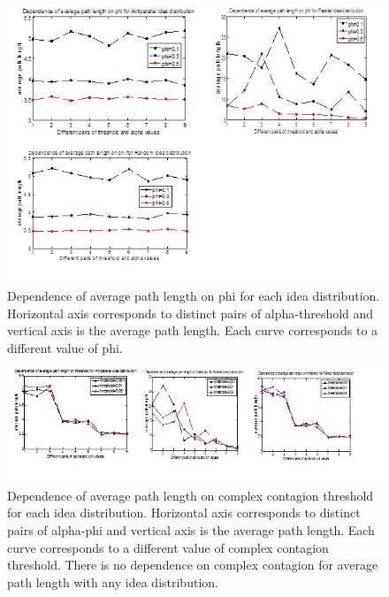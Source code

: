 \documentclass{beamer}
\begin{document}
\begin{frame}
\begin{figure}
[htp]
\begin{center}
\includegraphics{Fig14}
\end{center}
\caption {Dependence of average path length on phi for each idea distribution. Horizontal axis corresponds to distinct pairs of alpha-threshold and vertical axis is the average path length. Each curve corresponds to a different value of phi.}
\label {fig14}
\end{figure}


\begin{figure}
[htp]
\begin{center}
\includegraphics{Fig17}
\end{center}
\caption{ Dependence of average path length on complex contagion threshold for each idea distribution. Horizontal axis corresponds to distinct pairs of alpha-phi and vertical axis is the average path length. Each curve corresponds to a different value of complex contagion threshold. There is no dependence on complex contagion for average path length with any idea distribution.}
\label {fig17}
\end{figure}
\end{frame}
%
\end{document}
